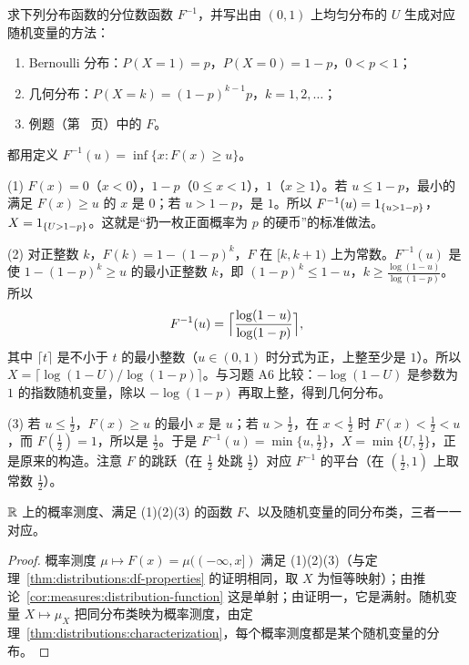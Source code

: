 \begin{workedexample}\label{we:distributions:quantile}
求下列分布函数的分位数函数 $F^{-1}$，并写出由 $(0,1)$ 上均匀分布的 $U$ 生成对应随机变量的方法：
\begin{enumerate}
\item Bernoulli 分布：$P(X=1)=p$，$P(X=0)=1-p$，$0<p<1$；
\item 几何分布：$P(X=k)=(1-p)^{k-1}p$，$k=1,2,\dots$；
\item 例题（第~\pageref{we:distributions:mixed} 页）中的 $F$。
\end{enumerate}
\end{workedexample}
\begin{solution}
都用定义 $F^{-1}(u)=\inf\{x:F(x)\geqslant u\}$。

(1) $F(x)=0$（$x<0$），$1-p$（$0\leqslant x<1$），$1$（$x\geqslant1$）。若 $u\leqslant1-p$，最小的满足 $F(x)\geqslant u$ 的 $x$ 是 $0$；若 $u>1-p$，是 $1$。所以 $F^{-1}(u)=1_{\{u>1-p\}}$，$X=1_{\{U>1-p\}}$。这就是“扔一枚正面概率为 $p$ 的硬币”的标准做法。

(2) 对正整数 $k$，$F(k)=1-(1-p)^k$，$F$ 在 $[k,k+1)$ 上为常数。$F^{-1}(u)$ 是使 $1-(1-p)^k\geqslant u$ 的最小正整数 $k$，即 $(1-p)^k\leqslant1-u$，$k\geqslant\frac{\log(1-u)}{\log(1-p)}$。所以
\[
F^{-1}(u)=\Bigl\lceil\frac{\log(1-u)}{\log(1-p)}\Bigr\rceil ,
\]
其中 $\lceil t\rceil$ 是不小于 $t$ 的最小整数（$u\in(0,1)$ 时分式为正，上整至少是 $1$）。所以 $X=\lceil\log(1-U)/\log(1-p)\rceil$。与习题 A6 比较：$-\log(1-U)$ 是参数为 $1$ 的指数随机变量，除以 $-\log(1-p)$ 再取上整，得到几何分布。

(3) 若 $u\leqslant\frac12$，$F(x)\geqslant u$ 的最小 $x$ 是 $u$；若 $u>\frac12$，在 $x<\frac12$ 时 $F(x)<\frac12<u$，而 $F(\frac12)=1$，所以是 $\frac12$。于是 $F^{-1}(u)=\min\{u,\frac12\}$，$X=\min\{U,\frac12\}$，正是原来的构造。注意 $F$ 的跳跃（在 $\frac12$ 处跳 $\frac12$）对应 $F^{-1}$ 的平台（在 $(\frac12,1)$ 上取常数 $\frac12$）。
\end{solution}

\begin{corollary}
$\mathbb{R}$ 上的概率测度、满足 (1)(2)(3) 的函数 $F$、以及随机变量的同分布类，三者一一对应。
\end{corollary}
\begin{proof}
概率测度 $\mu\mapsto F(x)=\mu((-\infty,x])$ 满足 (1)(2)(3)（与定理~\ref{thm:distributions:df-properties} 的证明相同，取 $X$ 为恒等映射）；由推论~\ref{cor:measures:distribution-function} 这是单射；由证明一，它是满射。随机变量 $X\mapsto\mu_X$ 把同分布类映为概率测度，由定理~\ref{thm:distributions:characterization}，每个概率测度都是某个随机变量的分布。
\end{proof}

